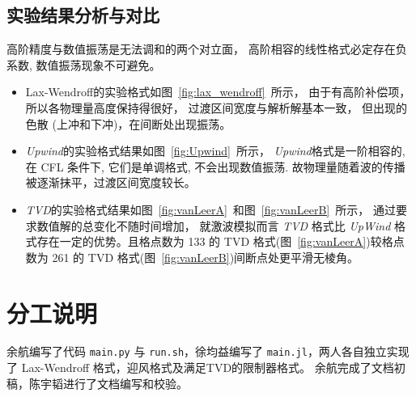 \documentclass[10.5pt
]{article}
\begin{document}
\subsection{实验结果分析与对比}



高阶精度与数值振荡是无法调和的两个对立面，
高阶相容的线性格式必定存在负系数, 数值振荡现象不可避免。

\begin{itemize}
	\item
Lax-Wendroff的实验格式如图~\ref{fig:lax_wendroff}~所示，
由于有高阶补偿项，
所以各物理量高度保持得很好，
过渡区间宽度与解析解基本一致，
但出现的色散 (上冲和下冲)，在间断处出现振荡。

\item
\textit{Upwind}的实验格式结果如图~\ref{fig:Upwind}~所示，
\textit{Upwind}格式是一阶相容的, 在 CFL 条件下, 它们是单调格式, 不会出现数值振荡.
故物理量随着波的传播被逐渐抹平，过渡区间宽度较长。

\item
\textit{TVD}的实验格式结果如图~\ref{fig:vanLeerA}~和图~\ref{fig:vanLeerB}~所示，
通过要求数值解的总变化不随时间增加，
就激波模拟而言 \textit{TVD} 格式比 \textit{UpWind} 格式存在一定的优势。且格点数为 133 的 TVD 格式(图~\ref{fig:vanLeerA})较格点数为 261 的 TVD 格式(图~\ref{fig:vanLeerB})间断点处更平滑无棱角。

\end{itemize}
\section{分工说明}
余航编写了代码 \verb|main.py| 与 \verb|run.sh|，徐均益编写了 \verb|main.jl|，两人各自独立实现了 Lax-Wendroff 格式，迎风格式及满足TVD的限制器格式。
余航完成了文档初稿，陈宇韬进行了文档编写和校验。
\end{document}
